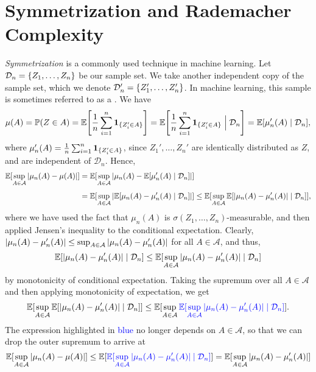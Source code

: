 \section{Symmetrization and Rademacher Complexity}
\label{sec: symmetrization}

\emph{Symmetrization} is a commonly used technique in machine learning. Let $\mathcal{D}_n = \set{Z_1, \dots, Z_n}$ be our sample set. We take another independent copy of the sample set, which we denote $\mathcal{D}_n' = \set{Z_1', \dots, Z_n'}$. In machine learning, this sample is sometimes referred to as a . We have
\[
    \mu(A) = \P(Z \in A) = \Exp\left[\frac{1}{n} \sum_{i=1}^n \ind{\{Z_i' \in A\}}\right] = \Exp\left[\frac{1}{n} \sum_{i=1}^n \ind{\{Z_i' \in A\}} \given[\Big] \mathcal{D}_n\right] = \Exp[\mu_n'(A) \given \mathcal{D}_n],
\]
where $\mu_n'(A) = \frac{1}{n} \sum_{i=1}^n \mathbf{1}_{\{Z_i' \in A\}}$, since $Z_1', \dots, Z_n'$ are identically distributed as $Z$, and are independent of $\mathcal{D}_n$. Hence,
\begin{align*}
    \Exp[\sup_{A \in \mathcal{A}} \abs{\mu_n(A) - \mu(A)}] &= \Exp[\sup_{A \in \mathcal{A}} \abs*{\mu_n(A) - \Exp[\mu_n'(A) \given \mathcal{D}_n]}] \\[4pt]
    &= \Exp[\sup_{A \in \mathcal{A}} \abs*{\Exp[\mu_n(A) - \mu_n'(A) \given \mathcal{D}_n]}] \leq \Exp[\sup_{A \in \mathcal{A}} \Exp[\abs*{\mu_n(A) - \mu_n'(A)} \given \mathcal{D}_n]],
\end{align*}
where we have used the fact that $\mu_n(A)$ is $\sigma(Z_1, \dots, Z_n)$-measurable, and then applied Jensen's inequality to the conditional expectation. Clearly, $\abs*{\mu_n(A) - \mu_n'(A)} \leq \sup_{A \in \mathcal{A}} \abs*{\mu_n(A) - \mu_n'(A)}$ for all $A \in \mathcal{A}$, and thus,
\[
    \Exp[\abs*{\mu_n(A) - \mu_n'(A)} \given \mathcal{D}_n] \leq \Exp[\sup_{A \in \mathcal{A}} \abs*{\mu_n(A) - \mu_n'(A)} \given \mathcal{D}_n]
\]
by monotonicity of conditional expectation. Taking the supremum over all $A \in \mathcal{A}$ and then applying monotonicity of expectation, we get
\[
    \Exp[\sup_{A \in \mathcal{A}} \Exp[\abs*{\mu_n(A) - \mu_n'(A)} \given \mathcal{D}_n]] \leq \Exp[\sup_{A \in \mathcal{A}} {\color{blue} \Exp[\sup_{A \in \mathcal{A}} \abs*{\mu_n(A) - \mu_n'(A)} \given \mathcal{D}_n]}].
\]
The expression highlighted in \textcolor{blue}{blue} no longer depends on $A \in \mathcal{A}$, so that we can drop the outer supremum to arrive at
\[
    \Exp[\sup_{A \in \mathcal{A}} \abs{\mu_n(A) - \mu(A)}] \leq \Exp[{\color{blue} \Exp[\sup_{A \in \mathcal{A}} \abs*{\mu_n(A) - \mu_n'(A)} \given \mathcal{D}_n]}] = \Exp[\sup_{A \in \mathcal{A}} \abs*{\mu_n(A) - \mu_n'(A)}]
\]
